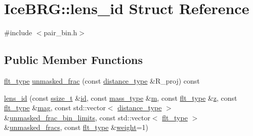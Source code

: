 \hypertarget{structIceBRG_1_1lens__id}{\section{Ice\-B\-R\-G\-:\-:lens\-\_\-id Struct Reference}
\label{structIceBRG_1_1lens__id}
}


{\ttfamily \#include $<$pair\-\_\-bin.\-h$>$}

\subsection*{Public Member Functions}
\begin{DoxyCompactItemize}
\item 
\hyperlink{lib_2IceBRG__main_2common_8h_ad0f130a56eeb944d9ef2692ee881ecc4}{flt\-\_\-type} \hyperlink{structIceBRG_1_1lens__id_a2c6395fe4131dd780569fdcb14ad2767}{unmasked\-\_\-frac} (const \hyperlink{namespaceIceBRG_a45499647eb87e24c10ab32c628711cec}{distance\-\_\-type} \&R\-\_\-proj) const 
\item 
\hyperlink{structIceBRG_1_1lens__id_aae9828867a9d13f043820f9084661b00}{lens\-\_\-id} (const \hyperlink{lib_2IceBRG__main_2common_8h_ab322a3e50421dc5f0c43316b1b373592}{ssize\-\_\-t} \&\hyperlink{structIceBRG_1_1lens__id_afd7ce5f12f3675c0c63e2b741c177652}{id}, const \hyperlink{namespaceIceBRG_a1be72ac4918a9b029f2eefa084213e35}{mass\-\_\-type} \&\hyperlink{structIceBRG_1_1lens__id_af2551e9da4443bc56540c32dee75fbb5}{m}, const \hyperlink{lib_2IceBRG__main_2common_8h_ad0f130a56eeb944d9ef2692ee881ecc4}{flt\-\_\-type} \&\hyperlink{structIceBRG_1_1lens__id_aedfbb8478463687a0aa5982105a9f8fc}{z}, const \hyperlink{lib_2IceBRG__main_2common_8h_ad0f130a56eeb944d9ef2692ee881ecc4}{flt\-\_\-type} \&\hyperlink{structIceBRG_1_1lens__id_a9685ba64aac6b662881132968034d32a}{mag}, const std\-::vector$<$ \hyperlink{namespaceIceBRG_a45499647eb87e24c10ab32c628711cec}{distance\-\_\-type} $>$ \&\hyperlink{structIceBRG_1_1lens__id_a6a4f65e3e6e010a6d3ad0e27ba84ad9b}{unmasked\-\_\-frac\-\_\-bin\-\_\-limits}, const std\-::vector$<$ \hyperlink{lib_2IceBRG__main_2common_8h_ad0f130a56eeb944d9ef2692ee881ecc4}{flt\-\_\-type} $>$ \&\hyperlink{structIceBRG_1_1lens__id_a9a3d312cb37f480aa07d94e5a39d714b}{unmasked\-\_\-fracs}, const \hyperlink{lib_2IceBRG__main_2common_8h_ad0f130a56eeb944d9ef2692ee881ecc4}{flt\-\_\-type} \&\hyperlink{structIceBRG_1_1lens__id_ab1474c2d0c19469e6bb8c333b2123586}{weight}=1)
\end{DoxyCompactItemize}
